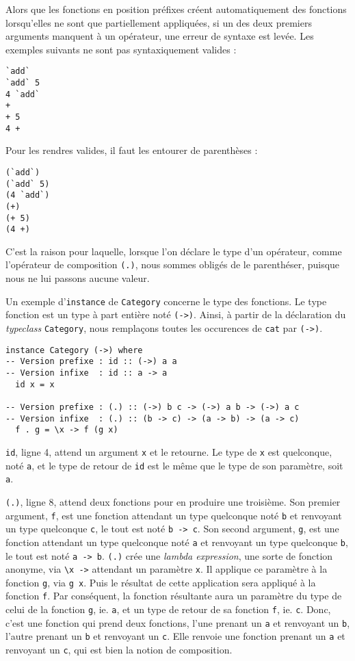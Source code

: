 \documentclass{llncs}
\begin{document}
Alors que les fonctions en position préfixes créent automatiquement des fonctions
lorsqu'elles ne sont que partiellement appliquées, si un des deux premiers arguments
manquent à un opérateur, une erreur de syntaxe est levée.
Les exemples suivants ne sont pas syntaxiquement valides :
\begin{lstlisting}
`add`
`add` 5
4 `add`
+
+ 5
4 +
\end{lstlisting}

Pour les rendres valides, il faut les entourer de parenthèses :
\begin{lstlisting}
(`add`)
(`add` 5)
(4 `add`)
(+)
(+ 5)
(4 +)
\end{lstlisting}

C'est la raison pour laquelle, lorsque l'on déclare le type d'un opérateur, comme
l'opérateur de composition \lstinline{(.)}, nous sommes obligés de le parenthéser,
puisque nous ne lui passons aucune valeur.

Un exemple d'\lstinline{instance} de \lstinline{Category} concerne le type des fonctions.
Le type fonction est un type à part entière noté \lstinline{(->)}.
Ainsi, à partir de la déclaration du \emph{typeclass} \lstinline{Category}, nous
remplaçons toutes les occurences de \lstinline{cat} par \lstinline{(->)}.
\begin{lstlisting}
instance Category (->) where
-- Version prefixe : id :: (->) a a
-- Version infixe  : id :: a -> a
  id x = x

-- Version prefixe : (.) :: (->) b c -> (->) a b -> (->) a c
-- Version infixe  : (.) :: (b -> c) -> (a -> b) -> (a -> c)
  f . g = \x -> f (g x)
\end{lstlisting}

\lstinline{id}, ligne 4, attend un argument \lstinline{x} et le retourne.
Le type de \lstinline{x} est quelconque, noté \lstinline{a}, et le type de retour
de \lstinline{id} est le même que le type de son paramètre, soit \lstinline{a}.

\lstinline{(.)}, ligne 8, attend deux fonctions pour en produire une troisième.
Son premier argument, \lstinline{f}, est une fonction attendant un type quelconque
noté \lstinline{b} et renvoyant un type quelconque \lstinline{c}, le tout est
noté \lstinline{b -> c}.
Son second argument, \lstinline{g}, est une fonction attendant un type quelconque
noté \lstinline{a} et renvoyant un type quelconque \lstinline{b}, le tout est
noté \lstinline{a -> b}.
\lstinline{(.)} crée une \emph{lambda expression}, une sorte de fonction anonyme,
via \lstinline{\x ->} attendant un paramètre \lstinline{x}.
Il applique ce paramètre à la fonction \lstinline{g}, via \lstinline{g x}.
Puis le résultat de cette application sera appliqué à la fonction \lstinline{f}.
Par conséquent, la fonction résultante aura un paramètre du type de celui de la
fonction \lstinline{g}, ie. \lstinline{a}, et un type de retour de sa fonction \lstinline{f},
ie. \lstinline{c}.
Donc, c'est une fonction qui prend deux fonctions, l'une prenant un \lstinline{a}
et renvoyant un \lstinline{b}, l'autre prenant un \lstinline{b} et renvoyant un \lstinline{c}.
Elle renvoie une fonction prenant un \lstinline{a} et renvoyant un \lstinline{c},
qui est bien la notion de composition.
\end{document}

